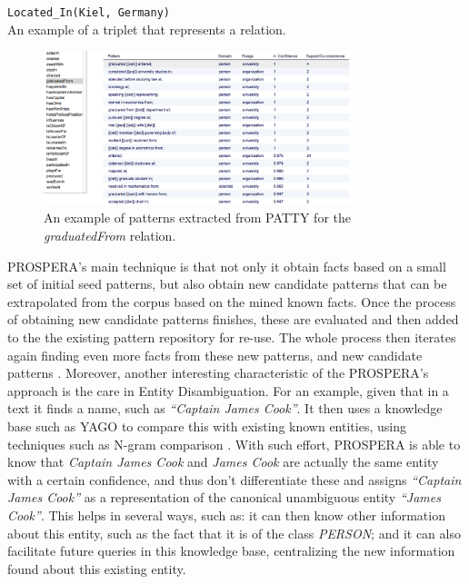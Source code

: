 \documentclass[11pt,a4paper,openright]{memoir}
\begin{document}
\begin{table}[!htbp]
  \centering
  \RaggedRight
    \texttt{Located\_In(Kiel, Germany)} \\
  \caption[An example of a triplet that represents a relation.]{An example of a triplet that represents a relation.}
  \label{tab:relation_example}
\end{table}

\begin{figure}[!htbp]
  \centering
    \includegraphics[width=0.8\textwidth]{./images/patty}
  \caption[An example of patterns extracted from PATTY.]{An example of patterns extracted from PATTY for the \emph{graduatedFrom} relation.}
  \label{fig:patty_examples}
\end{figure}

PROSPERA's main technique is that not only it obtain facts based on a small set of initial seed patterns, but also obtain new candidate patterns that can be extrapolated from the corpus based on the mined known facts. Once the process of obtaining new candidate patterns finishes, these are evaluated and then added to the the existing pattern repository for re-use. The whole process then iterates again finding even more facts from these new patterns, and new candidate patterns \cite{Nakashole:2011:SKH:1935826.1935869}. Moreover, another interesting characteristic of the PROSPERA's approach is the care in Entity Disambiguation. For an example, given that in a text it finds a name, such as \emph{\enquote{Captain James Cook}}. It then uses a knowledge base such as YAGO \cite{Suchanek2007} to compare this with existing known entities, using techniques such as N-gram comparison \cite{Nakashole:2011:SKH:1935826.1935869}. With such effort, PROSPERA is able to know that \emph{Captain James Cook} and \emph{James Cook} are actually the same entity with a certain confidence, and thus don't differentiate these and assigns \emph{\enquote{Captain James Cook}} as a representation of the canonical unambiguous entity \emph{\enquote{James Cook}}. This helps in several ways, such as: it can then know other information about this entity, such as the fact that it is of the class \emph{PERSON}; and it can also facilitate future queries in this knowledge base, centralizing the new information found about this existing entity.
\end{document}
